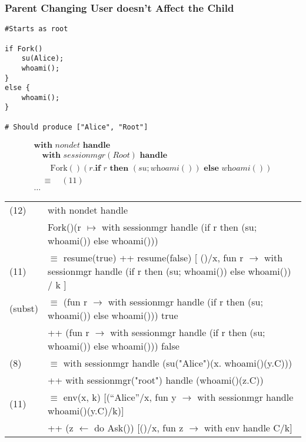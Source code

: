 \documentclass[logo,bsc,singlespacing,parskip]{infthesis}
\begin{document}
\subsubsection*{Parent Changing User doesn't Affect the Child}
\begin{lstlisting}
#Starts as root

if Fork()
    su(Alice);
    whoami();
}
else {
    whoami();
}

# Should produce ["Alice", "Root"]
\end{lstlisting}


\[
\begin{array}{l}
\textbf{with } \mathit{nondet} \textbf{ handle } \\
\quad \textbf{with } \mathit{sessionmgr(Root)} \textbf{ handle } \\
\quad\quad \text{Fork}()(r. \textbf{if } r \textbf{ then } (su; \textit{whoami}()) \textbf{ else } \textit{whoami}()) \\[5pt]
\quad\equiv\quad (11) \\
\ldots
\end{array}
\]




\begin{flushleft}
\renewcommand{\arraystretch}{1.3} %
\begin{tabularx}{\textwidth}{l X}
    (12) & with nondet handle \\
         & \quad Fork()(r $\mapsto$ with sessionmgr handle (if r then (su; whoami()) else whoami())) \\
    (11) & $\equiv$ resume(true) ++ resume(false) [ ()/x, fun r $\rightarrow$ with sessionmgr handle (if r then (su; whoami()) else whoami()) / k ] \\
    (subst) & $\equiv$ (fun r $\rightarrow$ with sessionmgr handle (if r then (su; whoami()) else whoami())) true \\
         & \quad ++ (fun r $\rightarrow$ with sessionmgr handle (if r then (su; whoami()) else whoami())) false \\
    (8) & $\equiv$ with sessionmgr handle (su("Alice")(x. whoami()(y.C))) \\
         & \quad ++ with sessionmgr("root") handle (whoami()(z.C)) \\
    (11) & $\equiv$ env(x, k) [(“Alice”/x, fun y $\rightarrow$ with sessionmgr handle whoami()(y.C)/k)] \\
         & \quad ++ (z $\leftarrow$ do Ask()) [()/x, fun z $\rightarrow$ with env handle C/k]
\end{tabularx}
\end{flushleft}
\end{document}
